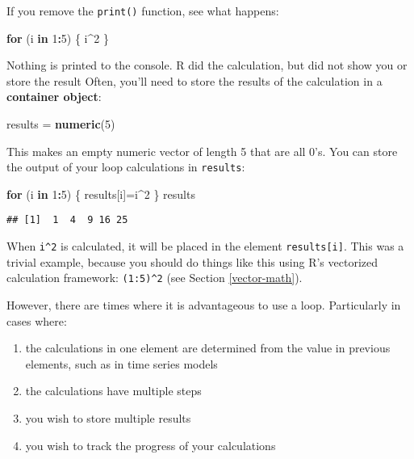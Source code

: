 \documentclass[]{book}
\newenvironment{Shaded}{\begin{snugshade}}{\end{snugshade}}
\newcommand{\KeywordTok}[1]{\textcolor[rgb]{0.13,0.29,0.53}{\textbf{#1}}}
\newcommand{\DecValTok}[1]{\textcolor[rgb]{0.00,0.00,0.81}{#1}}
\newcommand{\StringTok}[1]{\textcolor[rgb]{0.31,0.60,0.02}{#1}}
\newcommand{\ControlFlowTok}[1]{\textcolor[rgb]{0.13,0.29,0.53}{\textbf{#1}}}
\newcommand{\OperatorTok}[1]{\textcolor[rgb]{0.81,0.36,0.00}{\textbf{#1}}}
\newcommand{\NormalTok}[1]{#1}
\providecommand{\tightlist}{%
  \setlength{\itemsep}{0pt}\setlength{\parskip}{0pt}}
\theoremstyle{definition}
\theoremstyle{definition}
\theoremstyle{definition}
\theoremstyle{remark}
\begin{document}
If you remove the \texttt{print()} function, see what happens:

\begin{Shaded}
\begin{Highlighting}[]
\ControlFlowTok{for}\NormalTok{ (i }\ControlFlowTok{in} \DecValTok{1}\OperatorTok{:}\DecValTok{5}\NormalTok{) \{}
\NormalTok{  i}\OperatorTok{^}\DecValTok{2}
\NormalTok{\}}
\end{Highlighting}
\end{Shaded}

Nothing is printed to the console. R did the calculation, but did not
show you or store the result Often, you'll need to store the results of
the calculation in a \textbf{container object}:

\begin{Shaded}
\begin{Highlighting}[]
\NormalTok{results =}\StringTok{ }\KeywordTok{numeric}\NormalTok{(}\DecValTok{5}\NormalTok{)}
\end{Highlighting}
\end{Shaded}

This makes an empty numeric vector of length 5 that are all 0's. You can
store the output of your loop calculations in \texttt{results}:

\begin{Shaded}
\begin{Highlighting}[]
\ControlFlowTok{for}\NormalTok{ (i }\ControlFlowTok{in} \DecValTok{1}\OperatorTok{:}\DecValTok{5}\NormalTok{) \{}
\NormalTok{  results[i]=i}\OperatorTok{^}\DecValTok{2}
\NormalTok{\}}
\NormalTok{results}
\end{Highlighting}
\end{Shaded}

\begin{verbatim}
## [1]  1  4  9 16 25
\end{verbatim}

When \texttt{i\^{}2} is calculated, it will be placed in the element
\texttt{results{[}i{]}}. This was a trivial example, because you should
do things like this using R's vectorized calculation framework:
\texttt{(1:5)\^{}2} (see Section \ref{vector-math}).

However, there are times where it is advantageous to use a loop.
Particularly in cases where:

\begin{enumerate}
\def\labelenumi{\arabic{enumi}.}
\tightlist
\item
  the calculations in one element are determined from the value in
  previous elements, such as in time series models
\item
  the calculations have multiple steps
\item
  you wish to store multiple results
\item
  you wish to track the progress of your calculations
\end{enumerate}
\end{document}
